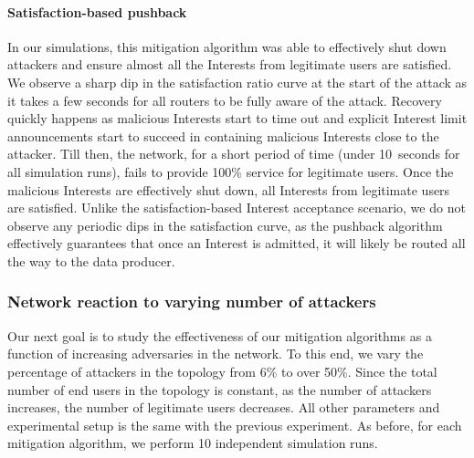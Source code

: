 
\paragraph{\textbf{Satisfaction-based pushback}}

In our simulations, this mitigation algorithm was able to effectively shut down attackers and ensure almost all the Interests from legitimate users are satisfied. 
We observe a  sharp dip in the satisfaction ratio curve at the start of the attack as it takes a few seconds for all routers to be fully aware of the attack. Recovery quickly happens as malicious Interests start to time out and explicit Interest limit announcements start to succeed in containing malicious Interests close to the attacker. Till then, the network, for a short period of time (under 10~seconds for all simulation runs), fails to provide 100\% service for legitimate users. Once the malicious Interests are effectively shut down, all Interests from legitimate users are satisfied. Unlike the satisfaction-based Interest acceptance scenario, we do not observe any periodic dips in the satisfaction curve, as the pushback algorithm effectively guarantees that once an Interest is admitted, it will likely be routed all the way to the data producer.

\subsubsection{Network reaction to varying number of attackers}

Our next goal is to study the effectiveness of our mitigation algorithms as a function of increasing adversaries in the network.
To this end, we vary the percentage of attackers in the topology from 6\% to over 50\%. Since the total number of end users in the topology is constant, as the number of attackers increases, the number of legitimate users decreases. All other parameters and experimental setup is the same with the previous experiment. As before, for each mitigation algorithm, we perform 10 independent simulation runs.


